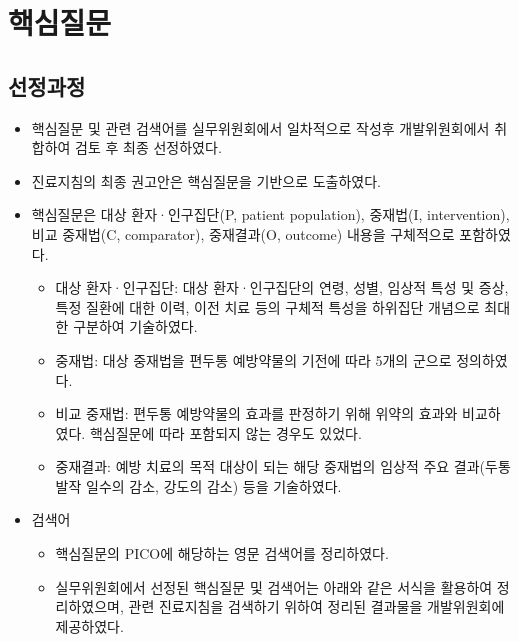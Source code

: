 \documentclass[]{book}
\providecommand{\tightlist}{%
  \setlength{\itemsep}{0pt}\setlength{\parskip}{0pt}}
\begin{document}
\hypertarget{section-49}{%
\section{핵심질문}\label{section-49}}

\hypertarget{section-50}{%
\subsection{선정과정}\label{section-50}}

\begin{itemize}
\item
  핵심질문 및 관련 검색어를 실무위원회에서 일차적으로 작성후 개발위원회에서 취합하여 검토 후 최종 선정하였다.
\item
  진료지침의 최종 권고안은 핵심질문을 기반으로 도출하였다.
\item
  핵심질문은 대상 환자·인구집단(P, patient population), 중재법(I, intervention), 비교 중재법(C, comparator), 중재결과(O, outcome) 내용을 구체적으로 포함하였다.

  \begin{itemize}
  \tightlist
  \item
    대상 환자·인구집단: 대상 환자·인구집단의 연령, 성별, 임상적 특성 및 증상, 특정 질환에 대한 이력, 이전 치료 등의 구체적 특성을 하위집단 개념으로 최대한 구분하여 기술하였다.\\
  \item
    중재법: 대상 중재법을 편두통 예방약물의 기전에 따라 5개의 군으로 정의하였다.
  \item
    비교 중재법: 편두통 예방약물의 효과를 판정하기 위해 위약의 효과와 비교하였다. 핵심질문에 따라 포함되지 않는 경우도 있었다.
  \item
    중재결과: 예방 치료의 목적 대상이 되는 해당 중재법의 임상적 주요 결과(두통 발작 일수의 감소, 강도의 감소) 등을 기술하였다.
  \end{itemize}
\item
  검색어

  \begin{itemize}
  \tightlist
  \item
    핵심질문의 PICO에 해당하는 영문 검색어를 정리하였다.
  \item
    실무위원회에서 선정된 핵심질문 및 검색어는 아래와 같은 서식을 활용하여 정리하였으며, 관련 진료지침을 검색하기 위하여 정리된 결과물을 개발위원회에 제공하였다.
  \end{itemize}
\end{itemize}
\end{document}
